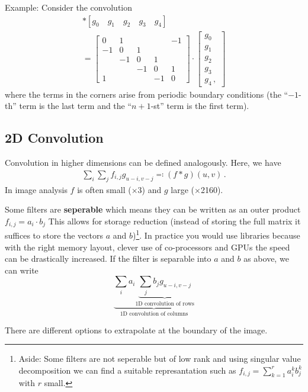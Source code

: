   Example: Consider
the convolution
\begin{gather*}
  [1 \quad 0 \quad -1] \ast [g_0\quad g_1\quad g_2\quad g_3 \quad g_4] \\
  =
  \begin{bmatrix}
    0 & 1 & & & -1 \\
    -1 & 0 & 1 & & \\
    & -1 & 0 & 1 & \\
    & & -1 & 0 & 1 \\
    1 & & & -1 & 0
  \end{bmatrix}\cdot
  \begin{bmatrix}
    g_0 \\ g_1 \\ g_2 \\ g_3 \\ g_4\,,
  \end{bmatrix}
\end{gather*}
where the terms in the corners arise from periodic boundary conditions
(\ie the ``$-1$-th'' term is the last term and the ``$n+1$-st'' term
is the first term).

\subsection*{2D Convolution}
Convolution in higher dimensions can be defined analogously. Here, we
have
\begin{gather*}
  \sum_i \sum_j f_{i,j}g_{u-i,v-j} \eqqcolon (f \ast g)(u,v)\,.
\end{gather*}
In image analysis $f$ is often small ($\times$3) and $g$ large
($\times$2160).

Some filters are \textbf{seperable} which means they can be written as
an outer product $f_{i,j} = a_i \cdot b_j$ This allows for storage
reduction (instead of storing the full matrix it suffices to store the
vectors $a$ and $b$)\footnote{Aside: Some filters are not seperable
  but of low rank and using singular value decomposition we can find a
  suitable represantation such as $f_{i,j} = \sum_{k=1}^r a_i^k b_j^k$
  with $r$ small.}. In practice you would use libraries because with
the right memory layout, clever use of co-processors and GPUs the
speed can be drastically increased. If the filter is separable into
$a$ and $b$ as above, we can write
\begin{equation*}
  \underbrace{
    \sum_i a_i \underbrace{
      \sum_j b_j g_{u-i,v-j}
    }_{\text{1D convolution of rows}}
  }_{\text{1D convolution of columns}}
\end{equation*}

There are different options to extrapolate at the boundary of the
image.


